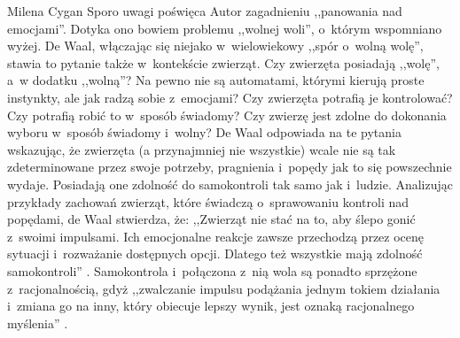 \begin{newrevplenv}{Milena Cygan}
Sporo uwagi poświęca Autor zagadnieniu ,,panowania nad emocjami''. Dotyka ono bowiem problemu ,,wolnej woli'', o~którym wspomniano wyżej. De Waal, włączając się niejako w~wielowiekowy ,,spór o~wolną wolę'', stawia to pytanie także w~kontekście zwierząt. Czy zwierzęta posiadają ,,wolę'', a~w dodatku ,,wolną''? Na pewno nie są automatami, którymi kierują proste instynkty, ale jak radzą sobie z~emocjami? Czy zwierzęta potrafią je kontrolować? Czy potrafią robić to w~sposób świadomy? Czy zwierzę jest zdolne do dokonania wyboru w~sposób świadomy i~wolny? De Waal odpowiada na te pytania wskazując, że zwierzęta (a przynajmniej nie wszystkie) wcale nie są tak zdeterminowane przez swoje potrzeby, pragnienia i~popędy jak to się powszechnie wydaje. Posiadają one zdolność do samokontroli tak samo jak i~ludzie. Analizując przykłady zachowań zwierząt, które świadczą o~sprawowaniu kontroli nad popędami, de Waal stwierdza, że: ,,Zwierząt nie stać na to, aby ślepo gonić z~swoimi impulsami. Ich emocjonalne reakcje zawsze przechodzą przez ocenę sytuacji i~rozważanie dostępnych opcji. Dlatego też wszystkie mają zdolność samokontroli''
\parencite[][s.~279]{waal_ostatni_2019}. %
 Samokontrola i~połączona z~nią wola są ponadto sprzężone z~racjonalnością, gdyż ,,zwalczanie impulsu podążania jednym tokiem działania i~zmiana go na inny, który obiecuje lepszy wynik, jest oznaką racjonalnego myślenia'' 
\parencite[][s.~279]{waal_ostatni_2019}.%



\end{newrevplenv}
